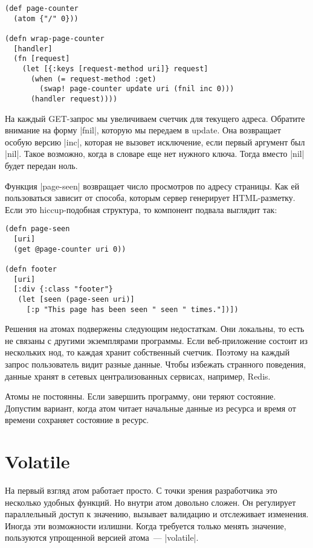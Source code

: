 \begin{verbatim}
(def page-counter
  (atom {"/" 0}))

(defn wrap-page-counter
  [handler]
  (fn [request]
    (let [{:keys [request-method uri]} request]
      (when (= request-method :get)
        (swap! page-counter update uri (fnil inc 0)))
      (handler request))))
\end{verbatim}

На каждый GET-запрос мы увеличиваем счетчик для текущего адреса. Обратите
внимание на форму \spverb|fnil|, которую мы передаем в update. Она возвращает особую
версию \spverb|inc|, которая не вызовет исключение, если первый аргумент был
\spverb|nil|. Такое возможно, когда в словаре еще нет нужного ключа. Тогда вместо \spverb|nil|
будет передан ноль.

Функция \spverb|page-seen| возвращает число просмотров по адресу страницы. Как ей
пользоваться зависит от способа, которым сервер генерирует HTML-разметку. Если
это hiccup-подобная структура, то компонент подвала выглядит так:

\begin{verbatim}
(defn page-seen
  [uri]
  (get @page-counter uri 0))

(defn footer
  [uri]
  [:div {:class "footer"}
   (let [seen (page-seen uri)]
     [:p "This page has been seen " seen " times."])])
\end{verbatim}

Решения на атомах подвержены следующим недостаткам. Они локальны, то есть не
связаны с другими экземплярами программы. Если веб-приложение состоит из
нескольких нод, то каждая хранит собственный счетчик. Поэтому на каждый запрос
пользователь видит разные данные. Чтобы избежать странного поведения, данные
хранят в сетевых централизованных сервисах, например, Redis.

Атомы не постоянны. Если завершить программу, они теряют состояние. Допустим
вариант, когда атом читает начальные данные из ресурса и время от времени
сохраняет состояние в ресурс.

\section{Volatile}

На первый взгляд атом работает просто. С точки зрения разработчика это несколько
удобных функций. Но внутри атом довольно сложен. Он регулирует параллельный
доступ к значению, вызывает валидацию и отслеживает изменения. Иногда эти
возможности излишни. Когда требуется только менять значение, пользуются
упрощенной версией атома~--- \spverb|volatile|.

